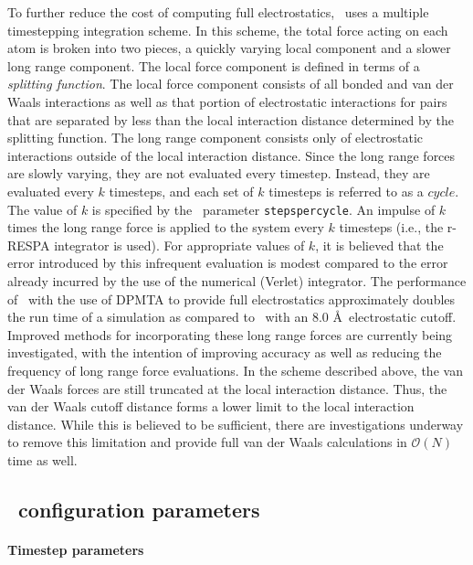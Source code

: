 To further reduce the cost of computing full electrostatics, 
\NAMD\ uses a multiple timestepping integration scheme.  In this scheme, 
the total force acting on each atom is broken into two pieces, a quickly varying local 
component and a slower long range component.  
The local force component is defined in terms of a {\it splitting function}.  The local force component consists of all bonded and van der Waals interactions
as well as that portion of electrostatic interactions for pairs that are separated by less than the local interaction distance determined by the splitting function.  
The long range component consists only of 
electrostatic interactions outside of the local interaction distance.
Since the long range forces are slowly varying, they are not evaluated
every timestep.  Instead, they are evaluated every $k$ timesteps, and
each set of $k$ timesteps is referred to as a $cycle$.
The value of $k$ is specified by the \NAMD\ parameter
\verb!stepspercycle!.  
An impulse of $k$ times the long range force is applied to the system
every $k$ timesteps (i.e., the r-RESPA integrator is used).
For appropriate values of $k$,
it is believed that the error introduced by this infrequent evaluation
is modest compared to the error already incurred by the use of the numerical
(Verlet) integrator.  
The performance of \NAMD\ with the use of DPMTA to provide 
full electrostatics approximately doubles the 
run time of a simulation as compared to \NAMD\ with an 
$8.0$ \AA\ electrostatic cutoff.  
Improved methods for incorporating these long range forces
are currently being investigated, 
with the intention of improving accuracy as well as 
reducing the frequency of long range force evaluations.  
\prettypar
In the scheme described above, the van der Waals forces are still 
truncated at the local interaction distance.  
Thus, the van der Waals cutoff distance 
forms a lower limit to the local interaction distance.  While this is
believed to be sufficient, there are investigations underway to remove
this limitation and provide full van der Waals calculations in 
${\mathcal O}(N)$ time as well.  


\subsection{\NAMD\ configuration parameters}
\label{section:config_basic}

\paragraph{Timestep parameters}

